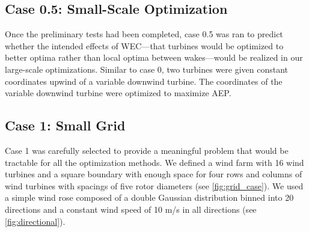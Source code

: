 \documentclass[a4paper]{jpconf}
\begin{document}
\subsection{Case 0.5: Small-Scale Optimization}
Once the preliminary tests had been completed, case 0.5 was ran to predict whether the intended effects of WEC---that turbines would be optimized to better optima rather than local optima between wakes---would be realized in our large-scale optimizations. Similar to case 0, two turbines were given constant coordinates upwind of a variable downwind turbine. The coordinates of the variable downwind turbine were optimized to maximize AEP.

\subsection{Case 1: Small Grid}
Case 1 was carefully selected to provide a meaningful problem that would be tractable for all the optimization methods. We defined a wind farm with 16 wind turbines and a square boundary with enough space for four rows and columns of wind turbines with spacings of five rotor diameters (see \cref{fig:grid_case}). We used a simple wind rose composed of a double Gaussian distribution binned into 20 directions and a constant wind speed of 10 m/s in all directions (see \cref{fig:directional}).
\end{document}
